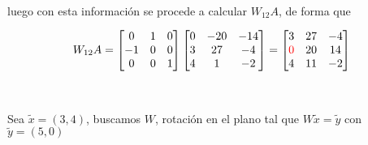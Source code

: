 \

\begin{center}    
\end{center}

luego con esta información se procede a calcular $W_{12}A$, de forma que

\[
W_{12}A = 
\begin{bmatrix}
    0 & 1 & 0 \\
    -1 & 0 & 0 \\
    0 & 0 & 1
\end{bmatrix}
\begin{bmatrix}
    0 & -20 & -14 \\
    3 & 27 & -4 \\
    4 & 1 & -2
\end{bmatrix}
=
\begin{bmatrix}
    3 & 27 & -4 \\
    \textcolor{red}{0} & 20 & 14 \\
    4 & 11 & -2
\end{bmatrix}
\]

\

Sea $\tilde{x} = (3,4)$, buscamos $W$, rotación en el plano tal que $W\tilde{x} = \tilde{y}$ con $\tilde{y} = (5,0)$

\begin{center}    
\end{center}

